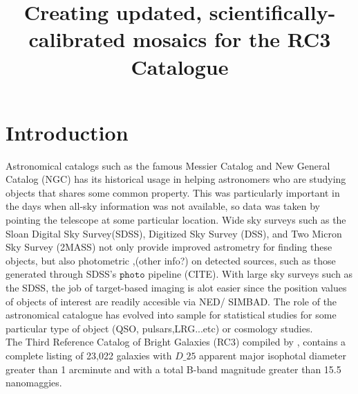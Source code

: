\documentclass[5p]{elsarticle}
\begin{document}
\title{Creating updated, scientifically-calibrated mosaics for the RC3 Catalogue}
\maketitle 

\section{Introduction}
Astronomical catalogs such as the famous Messier Catalog and New General Catalog (NGC) has its historical usage in helping  astronomers who are studying objects that shares some common property. This was particularly important in the days when all-sky information was not available, so data was taken by pointing the telescope at some particular location.  
Wide sky surveys such as the Sloan Digital Sky Survey(SDSS), Digitized Sky Survey (DSS), and Two Micron Sky Survey (2MASS) not only provide improved astrometry for finding these objects, but also photometric ,(other info?) on detected sources, such as those generated through SDSS's $\texttt{photo}$ pipeline (CITE).
With large sky surveys such as the SDSS, the job of target-based imaging is alot easier since the position values of objects of interest are readily accesible via NED/ SIMBAD. The role of the astronomical catalogue has evolved into sample for statistical studies for some particular type of object (QSO, pulsars,LRG...etc) or cosmology studies.
\\
\indent 
The Third Reference Catalog of Bright Galaxies (RC3) compiled by \citet{rc3}, contains a  complete listing of 23,022 galaxies with $D\_25$ apparent major isophotal diameter  greater than 1 arcminute and with a total B-band magnitude greater than 15.5 nanomaggies.
\end{document}

